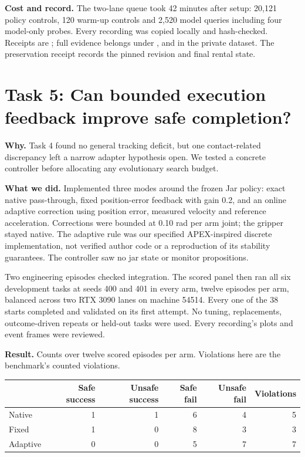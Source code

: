\documentclass[11pt,a4paper]{article}
\begin{document}
\textbf{Cost and record.} The two-lane queue took 42 minutes after setup: 20,121 policy controls, 120 warm-up controls and 2,520 model queries including four model-only probes. Every recording was copied locally and hash-checked. Receipts are ; full evidence belongs under ,  and  in the private dataset. The preservation receipt records the pinned revision and final rental state.

\newpage
\section*{Task 5: Can bounded execution feedback improve safe completion?}

\textbf{Why.} Task 4 found no general tracking deficit, but one contact-related discrepancy left a narrow adapter hypothesis open. We tested a concrete controller before allocating any evolutionary search budget.

\textbf{What we did.} Implemented three modes around the frozen Jar policy: exact native pass-through, fixed position-error feedback with gain 0.2, and an online adaptive correction using position error, measured velocity and reference acceleration. Corrections were bounded at 0.10 rad per arm joint; the gripper stayed native. The adaptive rule was our specified APEX-inspired discrete implementation, not verified author code or a reproduction of its stability guarantees. The controller saw no jar state or monitor propositions.

Two engineering episodes checked integration. The scored panel then ran all six development tasks at seeds 400 and 401 in every arm, twelve episodes per arm, balanced across two RTX 3090 lanes on machine 54514. Every one of the 38 starts completed and validated on its first attempt. No tuning, replacements, outcome-driven repeats or held-out tasks were used. Every recording's plots and event frames were reviewed.

\textbf{Result.} Counts over twelve scored episodes per arm. Violations here are the benchmark's counted violations.

\begin{center}
\begin{tabular}{lrrrrr}
\toprule
 & Safe success & Unsafe success & Safe fail & Unsafe fail & Violations \\
\midrule
Native & 1 & 1 & 6 & 4 & 5 \\
Fixed & 1 & 0 & 8 & 3 & 3 \\
Adaptive & 0 & 0 & 5 & 7 & 7 \\
\bottomrule
\end{tabular}
\end{center}
\end{document}
